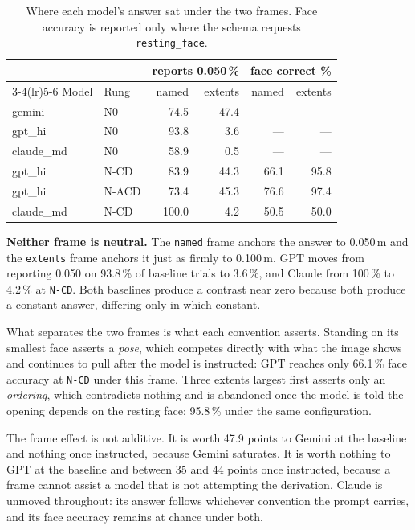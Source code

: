 \begin{table}[h]
\caption{Where each model's answer sat under the two frames. Face accuracy is
reported only where the schema requests \texttt{resting\_face}.}
\label{tab:ex2-anchor}
\centering
\begin{tabular}{llrrrr}
\toprule
& & \multicolumn{2}{c}{reports 0.050\,\%}
  & \multicolumn{2}{c}{face correct \%} \\
\cmidrule(lr){3-4}\cmidrule(lr){5-6}
Model & Rung & named & extents & named & extents \\
\midrule
gemini    & N0    & 74.5 & 47.4 & --- & --- \\
gpt\_hi   & N0    & 93.8 &  3.6 & --- & --- \\
claude\_md& N0    & 58.9 &  0.5 & --- & --- \\
gpt\_hi   & N-CD  & 83.9 & 44.3 & 66.1 & 95.8 \\
gpt\_hi   & N-ACD & 73.4 & 45.3 & 76.6 & 97.4 \\
claude\_md& N-CD  &100.0 &  4.2 & 50.5 & 50.0 \\
\bottomrule
\end{tabular}
\end{table}

\textbf{Neither frame is neutral.} The \texttt{named} frame anchors the answer
to 0.050\,m and the \texttt{extents} frame anchors it just as firmly to
0.100\,m. GPT moves from reporting 0.050 on 93.8\,\% of baseline trials to
3.6\,\%, and Claude from 100\,\% to 4.2\,\% at \texttt{N-CD}. Both baselines
produce a contrast near zero because both produce a constant answer, differing
only in which constant.

What separates the two frames is what each convention asserts. Standing on its
smallest face asserts a \emph{pose}, which competes directly with what the
image shows and continues to pull after the model is instructed: GPT reaches
only 66.1\,\% face accuracy at \texttt{N-CD} under this frame. Three extents
largest first asserts only an \emph{ordering}, which contradicts nothing and is
abandoned once the model is told the opening depends on the resting face:
95.8\,\% under the same configuration.

The frame effect is not additive. It is worth 47.9 points to Gemini at the
baseline and nothing once instructed, because Gemini saturates. It is worth
nothing to GPT at the baseline and between 35 and 44 points once instructed,
because a frame cannot assist a model that is not attempting the derivation.
Claude is unmoved throughout: its answer follows whichever convention the
prompt carries, and its face accuracy remains at chance under both.

